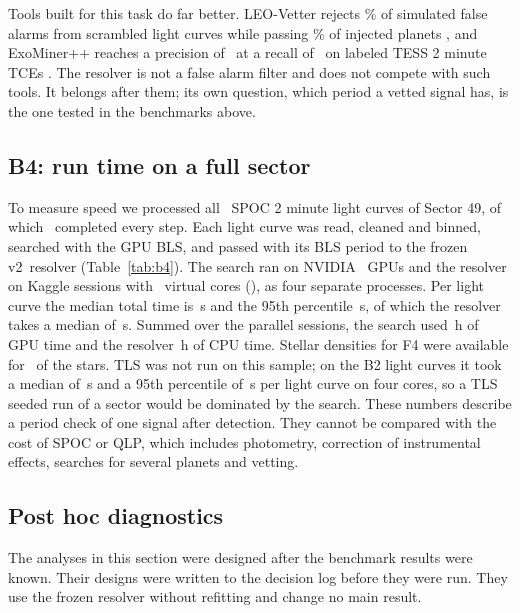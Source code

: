 \documentclass[twocolumn,linenumbers]{aastex701}
\newcommand{\Vtwo}{v2}
\begin{document}
Tools built for this task do far better. LEO-Vetter rejects \litLeoReject\% of simulated false alarms from scrambled light curves while passing \litLeoPass\% of injected planets \citep[][their Section~\litLeoSec]{Kunimoto2025leo}, and ExoMiner++ reaches a precision of \litExoPrec\ at a recall of \litExoRec\ on labeled TESS 2 minute TCEs \citep[][their Table~\litExoTab]{Valizadegan2025}. The resolver is not a false alarm filter and does not compete with such tools. It belongs after them; its own question, which period a vetted signal has, is the one tested in the benchmarks above.



\subsection{B4: run time on a full sector} \label{sec:b4}

To measure speed we processed all \bFourPinned\ SPOC 2 minute light curves of Sector 49, of which \bFourN\ completed every step. Each light curve was read, cleaned and binned, searched with the GPU BLS, and passed with its BLS period to the frozen \Vtwo\ resolver (Table~\ref{tab:b4}). The search ran on NVIDIA \bFourGpu\ GPUs and the resolver on Kaggle sessions with \bFourCores\ virtual cores (\bFourCpuRes), as four separate processes. Per light curve the median total time is \bFourTotalMed\,s and the 95th percentile \bFourTotalPnf\,s, of which the resolver takes a median of \bFourResMed\,s. Summed over the parallel sessions, the search used \bFourBlsWallH\,h of GPU time and the resolver \bFourResWallH\,h of CPU time. Stellar densities for F4 were available for \bFourStellar\ of the stars. TLS was not run on this sample; on the B2 light curves it took a median of \bFourTlsMed\,s and a 95th percentile of \bFourTlsPnf\,s per light curve on four cores, so a TLS seeded run of a sector would be dominated by the search. These numbers describe a period check of one signal after detection. They cannot be compared with the cost of SPOC or QLP, which includes photometry, correction of instrumental effects, searches for several planets and vetting.



\subsection{Post hoc diagnostics} \label{sec:diag}

The analyses in this section were designed after the benchmark results were known. Their designs were written to the decision log before they were run. They use the frozen resolver without refitting and change no main result.
\end{document}
